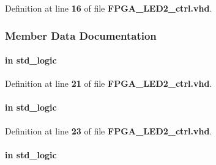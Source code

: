 Definition at line {\bf 16} of file {\bf F\+P\+G\+A\+\_\+\+L\+E\+D2\+\_\+ctrl.\+vhd}.



\subsubsection{Member Data Documentation}
\paragraph[{adf\+\_\+muxout}]{ {\bfseries \textcolor{keywordflow}{in}\textcolor{vhdlchar}{ }} {\bfseries \textcolor{comment}{std\+\_\+logic}\textcolor{vhdlchar}{ }} \hspace{0.3cm}{\ttfamily [Port]}}\label{classFPGA__LED2__ctrl_a06036f14cf052ed72c2d6e2e153a3b9f}


Definition at line {\bf 21} of file {\bf F\+P\+G\+A\+\_\+\+L\+E\+D2\+\_\+ctrl.\+vhd}.

\paragraph[{adf\+\_\+ss}]{ {\bfseries \textcolor{keywordflow}{in}\textcolor{vhdlchar}{ }} {\bfseries \textcolor{comment}{std\+\_\+logic}\textcolor{vhdlchar}{ }} \hspace{0.3cm}{\ttfamily [Port]}}\label{classFPGA__LED2__ctrl_aedfc6d79813c85825c07a512aaf3ec2e}


Definition at line {\bf 23} of file {\bf F\+P\+G\+A\+\_\+\+L\+E\+D2\+\_\+ctrl.\+vhd}.

\paragraph[{clk}]{ {\bfseries \textcolor{keywordflow}{in}\textcolor{vhdlchar}{ }} {\bfseries \textcolor{comment}{std\+\_\+logic}\textcolor{vhdlchar}{ }} \hspace{0.3cm}{\ttfamily [Port]}}\label{classFPGA__LED2__ctrl_a4a4609c199d30b3adebbeb3a01276ec5}


